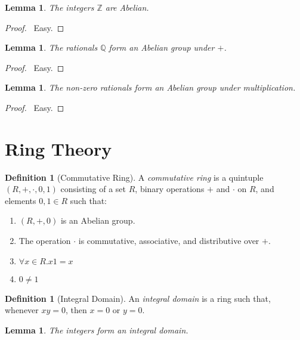 \documentclass{article}
\let\qed\relax
\newtheorem{lemma}[axiom]{Lemma}
\theoremstyle{definition}
\newtheorem{definition}[axiom]{Definition}
\begin{document}
    \begin{lemma}
        The integers $\mathbb{Z}$ are Abelian.
    \end{lemma}

    \begin{proof}
        \pf\ Easy. \qed
    \end{proof}

    \begin{lemma}
        The rationals $\mathbb{Q}$ form an Abelian group under $+$.
    \end{lemma}

    \begin{proof}
        \pf\ Easy.
    \end{proof}

    \begin{lemma}
        The non-zero rationals form an Abelian group under multiplication.
    \end{lemma}

    \begin{proof}
        \pf\ Easy. \qed
    \end{proof}

    \section{Ring Theory}

    \begin{definition}[Commutative Ring]
        A \emph{commutative ring} is a quintuple $(R, +, \cdot, 0, 1)$ consisting of a set $R$,
        binary operations $+$ and $\cdot$ on $R$, and elements $0,1 \in R$ such that:
        \begin{enumerate}
            \item $(R, +, 0)$ is an Abelian group.
            \item The operation $\cdot$ is commutative, associative, and distributive over $+$.
            \item $\forall x \in R. x1 = x$
            \item $0 \neq 1$
        \end{enumerate}
    \end{definition}

    \begin{definition}[Integral Domain]
        An \emph{integral domain} is a ring such that, whenever $xy = 0$, then $x = 0$ or $y = 0$.
    \end{definition}

    \begin{lemma}
        The integers form an integral domain.
    \end{lemma}
\end{document}
